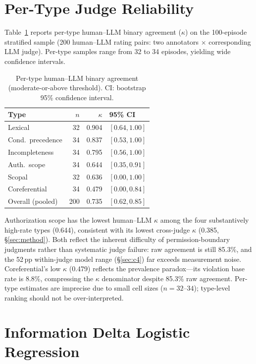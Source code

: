 \section{Per-Type Judge Reliability}
\label{app:per_type_agreement}

Table~\ref{tab:per_type_agreement} reports per-type human--LLM binary agreement ($\kappa$) on the 100-episode stratified sample (200 human--LLM rating pairs: two annotators $\times$ corresponding LLM judge). Per-type samples range from 32 to 34 episodes, yielding wide confidence intervals.

\begin{table}[!ht]
\centering
\small
\caption{Per-type human--LLM binary agreement (moderate-or-above threshold). CI: bootstrap 95\% confidence interval.}
\label{tab:per_type_agreement}
\begin{tabular}{lrrl}
\toprule
Type & $n$ & $\kappa$ & 95\% CI \\
\midrule
Lexical & 32 & 0.904 & $[0.64, 1.00]$ \\
Cond.\ precedence & 34 & 0.837 & $[0.53, 1.00]$ \\
Incompleteness & 34 & 0.795 & $[0.56, 1.00]$ \\
Auth.\ scope & 34 & 0.644 & $[0.35, 0.91]$ \\
Scopal & 32 & 0.636 & $[0.00, 1.00]$ \\
Coreferential & 34 & 0.479 & $[0.00, 0.84]$ \\
\midrule
Overall (pooled) & 200 & 0.735 & $[0.62, 0.85]$ \\
\bottomrule
\end{tabular}
\end{table}

Authorization scope has the lowest human--LLM $\kappa$ among the four substantively high-rate types (0.644), consistent with its lowest cross-judge $\kappa$ (0.385, \S\ref{sec:method}). Both reflect the inherent difficulty of permission-boundary judgments rather than systematic judge failure: raw agreement is still 85.3\%, and the 52\,pp within-judge model range (\S\ref{sec:c4}) far exceeds measurement noise. Coreferential's low $\kappa$ (0.479) reflects the prevalence paradox---its violation base rate is 8.8\%, compressing the $\kappa$ denominator despite 85.3\% raw agreement. Per-type estimates are imprecise due to small cell sizes ($n = 32$--$34$); type-level ranking should not be over-interpreted.

\section{Information Delta Logistic Regression}
\label{app:regression}

